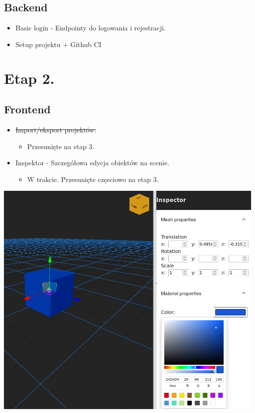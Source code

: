 \documentclass[11pt]{article}
\begin{document}
\subsection{Backend}
\label{sec:org02c818c}
\begin{itemize}
\item Basic login - Endpointy do logowania i rejestracji.
\item Setup projektu + Github CI
\end{itemize}
\section{Etap 2.}
\label{sec:orgd52bb6b}
\subsection{Frontend}
\label{sec:org5921521}
\begin{itemize}
\item \sout{Import/eksport projektów.}
\begin{itemize}
\item Przesunięte na etap 3.
\end{itemize}
\item Inspektor - Szczegółowa edycja obiektów na scenie.
\begin{itemize}
\item W trakcie. Przesunięte częsciowo na etap 3.
\end{itemize}
\end{itemize}
\begin{center}
\includegraphics[width=.9\linewidth]{./img/inspector-demo.jpg}
\end{center}
\end{document}
